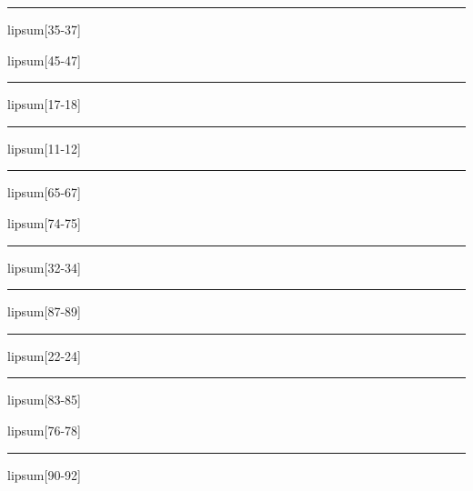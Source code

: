 \documentclass[11pt,a4paper]{article}
\begin{document}
\begin{simplewrap}
  \textcolor{lime!25}{\rule{5.2cm}{7.0cm}}
\end{simplewrap}
lipsum[35-37]

lipsum[45-47]

\begin{simplewrap}
  \textcolor{blue!54}{\rule{4.4cm}{3.5cm}}
\end{simplewrap}
lipsum[17-18]

\begin{simplewrap}
  \textcolor{blue!12}{\rule{3.9cm}{2.4cm}}
\end{simplewrap}
lipsum[11-12]

\begin{simplewrap}
  \textcolor{violet!42}{\rule{4.2cm}{8.5cm}}
\end{simplewrap}
lipsum[65-67]

lipsum[74-75]

\begin{simplewrap}
  \textcolor{lime!59}{\rule{3.1cm}{7.2cm}}
\end{simplewrap}
lipsum[32-34]

\begin{simplewrap}
  \textcolor{olive!35}{\rule{5.2cm}{9.2cm}}
\end{simplewrap}
lipsum[87-89]

\begin{simplewrap}
  \textcolor{red!54}{\rule{4.5cm}{9.4cm}}
\end{simplewrap}
lipsum[22-24]

\begin{simplewrap}
  \textcolor{green!37}{\rule{4.8cm}{8.6cm}}
\end{simplewrap}
lipsum[83-85]

lipsum[76-78]

\begin{simplewrap}
  \textcolor{violet!38}{\rule{4.8cm}{5.4cm}}
\end{simplewrap}
lipsum[90-92]
\end{document}
